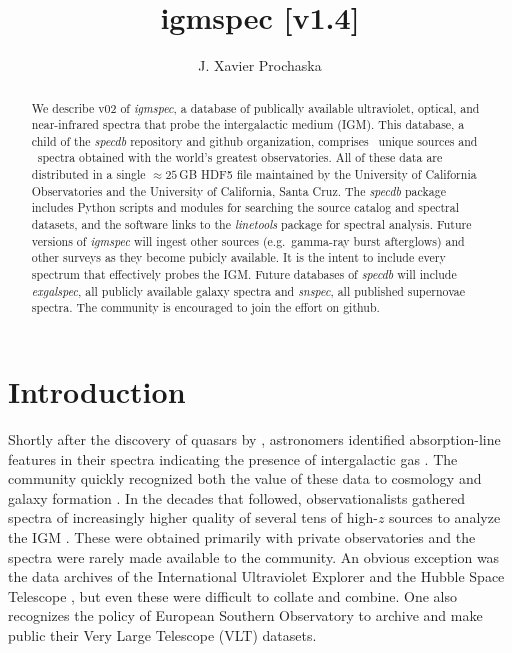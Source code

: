 \documentclass[12pt]{elsarticle}
\begin{document}
\begin{frontmatter}

\title{igmspec
[v1.4]}

\author{
J. Xavier Prochaska}%
\address{
Department of Astronomy and Astrophysics, UCO/Lick Observatory, University of California, 1156 High Street, Santa Cruz, CA 95064}

\begin{abstract}
We describe v02 of {\it igmspec}, a database of publically
available ultraviolet, optical, and near-infrared spectra 
that probe the intergalactic medium (IGM).  This database, a child
of the {\it specdb} repository and github organization, 
comprises \nsource~unique
sources and \nspectra~spectra obtained with the world's greatest
observatories.  All of these data are distributed in a single
$\approx 25$\,GB HDF5 file maintained by the University of
California Observatories and the University of California,
Santa Cruz.  The {\it specdb} package includes
Python scripts and modules for searching the source catalog
and spectral datasets, and the software links to the {\it linetools}
package for spectral analysis.
Future versions of {\it igmspec} will ingest other sources
(e.g.\ gamma-ray burst afterglows) and other surveys as they become
pubicly available.  It is the intent to include every 
spectrum that effectively probes the IGM.  
Future databases of {\it specdb}
will include {\it exgalspec}, all publicly available galaxy
spectra and {\it snspec}, all published supernovae spectra.
The community is encouraged to join the effort on github.
\end{abstract}

\end{frontmatter}


\section{Introduction}
\label{sec:intro}

Shortly after the discovery of quasars by \cite{schmidt63},
astronomers identified absorption-line features in their 
spectra indicating the presence of intergalactic gas
\citep{bs65,blb66}.  
The community quickly recognized both the value of these
data to cosmology and galaxy formation \citep{gp65,bs69}.
In the decades that followed, observationalists gathered
spectra of increasingly higher quality of several tens of
high-$z$ sources to analyze the IGM 
\citep{sargent80,tytler82,wolfe86,lzt91}.
These were obtained primarily with private observatories and
the spectra were rarely made available
to the community.
An obvious exception was the data archives of the
International Ultraviolet Explorer
and the Hubble Space Telescope 
\citep[{\it HST};][]{hstkeyproj_1,bechtold02},
but even these were difficult to 
collate and combine.
One also recognizes the policy of European Southern
Observatory to archive and
make public their Very Large Telescope (VLT) datasets.
\end{document}
